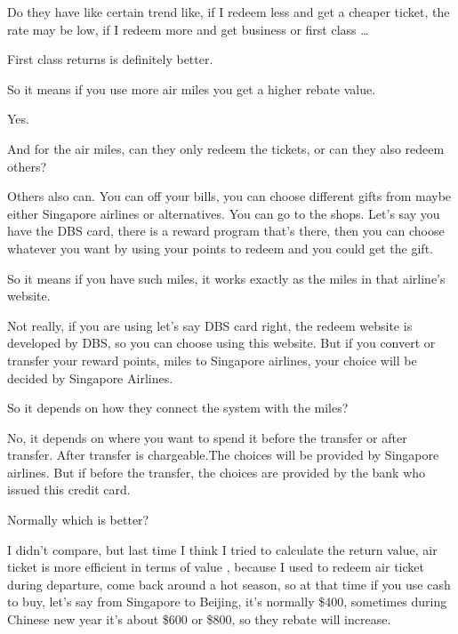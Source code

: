 \begin{description}[leftmargin=4em,style=nextline]
	\item[JH:] Do they have like certain trend like, if I redeem less and get a cheaper ticket, the rate may be low, if I redeem more and get business or first class …

	\item[HJ:] First class returns is definitely better.

	\item[JH:] So it means if you use more air miles you get a higher rebate value.

	\item[HJ:] Yes.

	\item[JH:] And for the air miles, can they only redeem the tickets, or can they also redeem others?

	\item[HJ:] Others also can. You can off your bills, you can choose different gifts from maybe either Singapore airlines or alternatives. You can go to the shops. Let’s say you have the DBS card, there is a reward program that’s there, then you can choose whatever you want by using your points to redeem and you could get the gift.

	\item[JH:] So it means if you have such miles, it works exactly as the miles in that airline’s website.

	\item[HJ:] Not really, if you are using let’s say DBS card right, the redeem website is developed by DBS, so you can choose using this website. But if you convert or transfer your reward points, miles to Singapore airlines, your choice will be decided by Singapore Airlines.

	\item[JH:] So it depends on how they connect the system with the miles?

	\item[HJ:] No, it depends on where you want to spend it before the transfer or after transfer. After transfer is chargeable.The choices will be provided by Singapore airlines. But if before the transfer, the choices are provided by the bank who issued this credit card.

	\item[JH:] Normally which is better?

	\item[HJ:] I didn’t compare, but last time I think I tried to calculate the return value, air ticket is more efficient in terms of value , because I used to redeem air ticket during departure, come back around a hot season, so at that time if you use cash to buy, let’s say from Singapore to Beijing, it’s normally \$400, sometimes during Chinese new year it’s about \$600 or \$800, so they rebate will increase.


\end{description}
